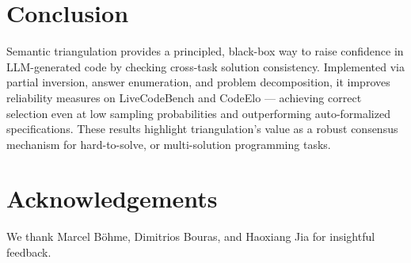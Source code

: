 \documentclass[acmsmall,screen,nonacm]{acmart}
\newcommand{\toolName}{\textsc{just-tri-it}\xspace}
\begin{document}


\section{Conclusion}

Semantic triangulation provides a principled, black-box way to raise confidence in LLM-generated code by checking cross-task solution consistency. Implemented via partial inversion, answer enumeration, and problem decomposition, it improves reliability measures on LiveCodeBench and CodeElo --- achieving correct selection even at low sampling probabilities and outperforming auto-formalized specifications. These results highlight triangulation’s value as a robust consensus mechanism for hard-to-solve, or multi-solution programming tasks.



\section{Acknowledgements}

We thank Marcel B{\"o}hme, Dimitrios Bouras, and Haoxiang Jia for insightful feedback.
\end{document}
